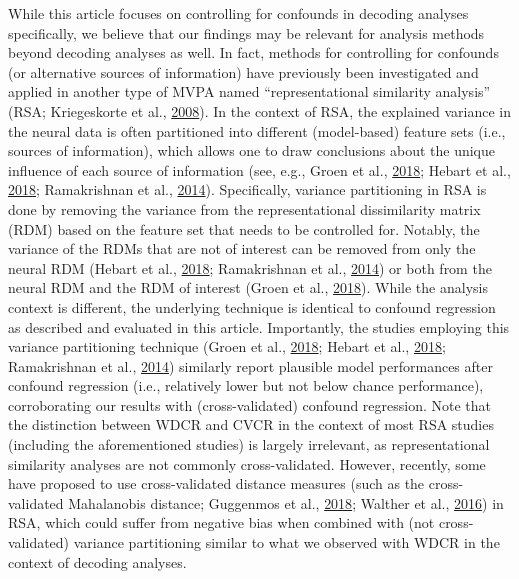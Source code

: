 \documentclass[11pt,american,a4paper,oneside,]{memoir} %
\begin{document}
While this article focuses on controlling for confounds in decoding analyses specifically, we believe that our findings may be relevant for analysis methods beyond decoding analyses as well. In fact, methods for controlling for confounds (or alternative sources of information) have previously been investigated and applied in another type of MVPA named ``representational similarity analysis'' (RSA; Kriegeskorte et al., \protect\hyperlink{ref-kriegeskorte2008representational}{2008}). In the context of RSA, the explained variance in the neural data is often partitioned into different (model-based) feature sets (i.e., sources of information), which allows one to draw conclusions about the unique influence of each source of information (see, e.g., Groen et al., \protect\hyperlink{ref-Groen2018-qo}{2018}; Hebart et al., \protect\hyperlink{ref-Hebart2018-dz}{2018}; Ramakrishnan et al., \protect\hyperlink{ref-Ramakrishnan2014-ki}{2014}). Specifically, variance partitioning in RSA is done by removing the variance from the representational dissimilarity matrix (RDM) based on the feature set that needs to be controlled for. Notably, the variance of the RDMs that are not of interest can be removed from only the neural RDM (Hebart et al., \protect\hyperlink{ref-Hebart2018-dz}{2018}; Ramakrishnan et al., \protect\hyperlink{ref-Ramakrishnan2014-ki}{2014}) or both from the neural RDM and the RDM of interest (Groen et al., \protect\hyperlink{ref-Groen2018-qo}{2018}). While the analysis context is different, the underlying technique is identical to confound regression as described and evaluated in this article. Importantly, the studies employing this variance partitioning technique (Groen et al., \protect\hyperlink{ref-Groen2018-qo}{2018}; Hebart et al., \protect\hyperlink{ref-Hebart2018-dz}{2018}; Ramakrishnan et al., \protect\hyperlink{ref-Ramakrishnan2014-ki}{2014}) similarly report plausible model performances after confound regression (i.e., relatively lower but not below chance performance), corroborating our results with (cross-validated) confound regression. Note that the distinction between WDCR and CVCR in the context of most RSA studies (including the aforementioned studies) is largely irrelevant, as representational similarity analyses are not commonly cross-validated. However, recently, some have proposed to use cross-validated distance measures (such as the cross-validated Mahalanobis distance; Guggenmos et al., \protect\hyperlink{ref-Guggenmos2018-rr}{2018}; Walther et al., \protect\hyperlink{ref-Walther2016-je}{2016}) in RSA, which could suffer from negative bias when combined with (not cross-validated) variance partitioning similar to what we observed with WDCR in the context of decoding analyses.
\end{document}
